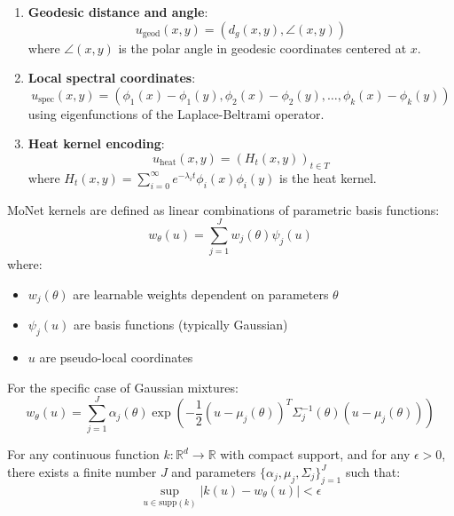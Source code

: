 \begin{enumerate}
    \item \textbf{Geodesic distance and angle}:
    \begin{equation}
    u_{\text{geod}}(x, y) = (d_g(x, y), \angle(x, y))
    \end{equation}
    where $\angle(x, y)$ is the polar angle in geodesic coordinates centered at $x$.

    \item \textbf{Local spectral coordinates}:
    \begin{equation}
    u_{\text{spec}}(x, y) = (\phi_1(x) - \phi_1(y), \phi_2(x) - \phi_2(y), \ldots, \phi_k(x) - \phi_k(y))
    \end{equation}
    using eigenfunctions of the Laplace-Beltrami operator.

    \item \textbf{Heat kernel encoding}:
    \begin{equation}
    u_{\text{heat}}(x, y) = (H_t(x, y))_{t \in T}
    \end{equation}
    where $H_t(x, y) = \sum_{i=0}^{\infty} e^{-\lambda_i t} \phi_i(x) \phi_i(y)$ is the heat kernel.
\end{enumerate}

\begin{definition}\label{def:kernel_monet}
MoNet kernels are defined as linear combinations of parametric basis functions:
\begin{equation}
w_\theta(u) = \sum_{j=1}^J w_j(\theta) \psi_j(u)
\end{equation}
where:
\begin{itemize}
    \item $w_j(\theta)$ are learnable weights dependent on parameters $\theta$
    \item $\psi_j(u)$ are basis functions (typically Gaussian)
    \item $u$ are pseudo-local coordinates
\end{itemize}

For the specific case of Gaussian mixtures:
\begin{equation}
w_\theta(u) = \sum_{j=1}^J \alpha_j(\theta) \exp\left(-\frac{1}{2}(u - \mu_j(\theta))^T \Sigma_j^{-1}(\theta) (u - \mu_j(\theta))\right)
\end{equation}
\end{definition}

\begin{theorem}\label{thm:universal_approximation_monet}
For any continuous function $k: \mathbb{R}^d \to \mathbb{R}$ with compact support, and for any $\epsilon > 0$, there exists a finite number $J$ and parameters $\{\alpha_j, \mu_j, \Sigma_j\}_{j=1}^J$ such that:
\begin{equation}
\sup_{u \in \text{supp}(k)} |k(u) - w_\theta(u)| < \epsilon
\end{equation}
\end{theorem}

